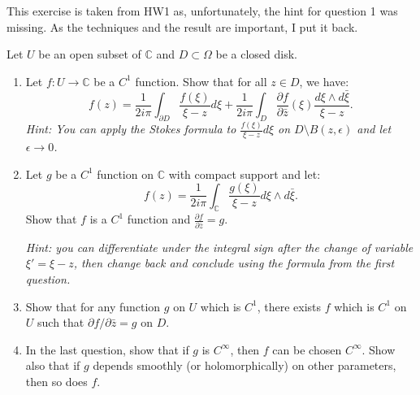 \documentclass[12pt]{article}
\begin{document}
\begin{problab}{2}
This exercise is taken from HW1 as, unfortunately, the hint for question 1 was missing. As the techniques and the result are important, I put it back.

Let $U$ be an open subset of $\mathbb{C}$ and $D \subset \Omega$ be a closed disk.

\begin{enumerate}
    \item Let $f : U \to \mathbb{C}$ be a $C^1$ function. Show that for all $z \in D$, we have:
    \[
    f(z) = \frac{1}{2i\pi} \int_{\partial D} \frac{f(\xi)}{\xi - z} d\xi + \frac{1}{2i\pi} \int_D \frac{\partial f}{\partial \bar{z}}(\xi) \frac{d\xi \wedge d\bar{\xi}}{\xi - z}.
    \]
    \textit{Hint: You can apply the Stokes formula to $\frac{f(\xi)}{\xi-z} d\xi$ on $D \setminus B(z, \epsilon)$ and let $\epsilon \to 0$.}

    \item Let $g$ be a $C^1$ function on $\mathbb{C}$ with compact support and let:
    \[
    f(z) = \frac{1}{2i\pi} \int_{\mathbb{C}} \frac{g(\xi)}{\xi - z} d\xi \wedge d\bar{\xi}.
    \]
    Show that $f$ is a $C^1$ function and $\frac{\partial f}{\partial \bar{z}} = g$.

    \textit{Hint: you can differentiate under the integral sign after the change of variable $\xi' = \xi - z$, then change back and conclude using the formula from the first question.}

    \item Show that for any function $g$ on $U$ which is $C^1$, there exists $f$ which is $C^1$ on $U$ such that $\partial f/\partial \bar{z} = g$ on $D$.

    \item In the last question, show that if $g$ is $C^\infty$, then $f$ can be chosen $C^\infty$. Show also that if $g$ depends smoothly (or holomorphically) on other parameters, then so does $f$.
\end{enumerate}
\end{problab}
\begin{solu}

\end{solu}
\newpage
\end{document}

